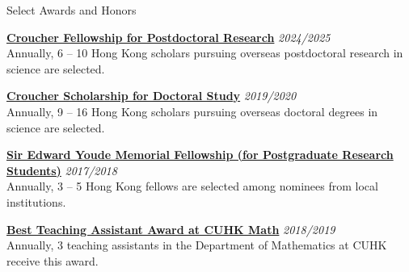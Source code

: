 \documentclass{resume} %
\begin{document}
\begin{rSection}{Select Awards and Honors}

\href{https://scholars.croucher.org.hk/scholars/siu-chun-yin}{\textbf{Croucher Fellowship for Postdoctoral Research}} \hfill {\em 2024/2025}\\
Annually, 6 -- 10 Hong Kong scholars pursuing overseas postdoctoral research in science are selected.

\href{https://scholars.croucher.org.hk/scholars/siu-chun-yin}{\textbf{Croucher Scholarship for Doctoral Study}} \hfill {\em 2019/2020}\\
Annually, 9 -- 16 Hong Kong scholars pursuing overseas doctoral degrees in science are selected.

\href{https://www.wfsfaa.gov.hk/sfo/seymf/en/index.htm}{\textbf{Sir Edward Youde Memorial Fellowship (for Postgraduate Research Students)}} \hfill {\em 2017/2018}\\
Annually, 3 -- 5 Hong Kong fellows are selected among nominees from local institutions.

\href{https://www.math.cuhk.edu.hk/student-centre/scholarships/best-teaching-assistant-award}{\textbf{Best Teaching Assistant Award at CUHK Math}} \hfill {\em 2018/2019}\\
Annually, 3 teaching assistants in the Department of Mathematics at CUHK receive this award.

\end{rSection}

\newpage
\end{document}
